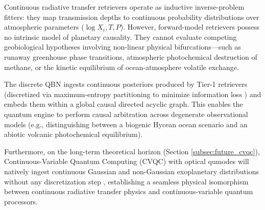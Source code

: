Continuous radiative transfer retrievers operate as inductive inverse-problem fitters: they map transmission depths to continuous probability distributions over atmospheric parameters ($\log X_i, T, P$). However, forward-model retrievers possess no intrinsic model of planetary causality. They cannot evaluate competing geobiological hypotheses involving non-linear physical bifurcations—such as runaway greenhouse phase transitions, atmospheric photochemical destruction of methane, or the kinetic equilibrium of ocean-atmosphere volatile exchange. 

The discrete QBN ingests continuous posteriors produced by Tier-1 retrievers (discretized via maximum-entropy partitioning to minimize information loss \cite{friedman1996}) and embeds them within a global causal directed acyclic graph. This enables the quantum engine to perform causal arbitration across degenerate observational models (e.g., distinguishing between a biogenic Hycean ocean scenario and an abiotic volcanic photochemical equilibrium). 

Furthermore, on the long-term theoretical horizon (Section \ref{subsec:future_cvqc}), Continuous-Variable Quantum Computing (CVQC) with optical qumodes will natively ingest continuous Gaussian and non-Gaussian exoplanetary distributions without any discretization step \cite{weedbrook2012}, establishing a seamless physical isomorphism between continuous radiative transfer physics and continuous-variable quantum processors.
